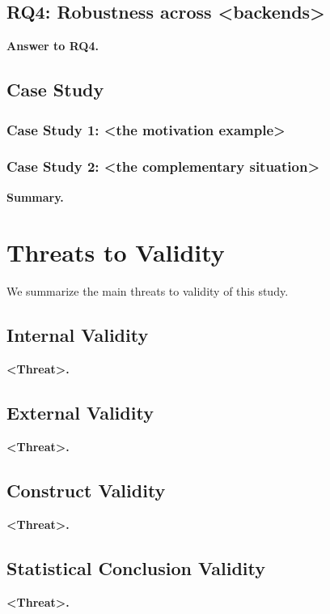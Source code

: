 \documentclass[manuscript,anonymous]{acmart}
\begin{document}
\subsection{RQ4: Robustness across <backends>}
\begin{answerbox}\textbf{Answer to RQ4.}\end{answerbox}

\subsection{Case Study}\label{sec:case_study}

\subsubsection{Case Study 1: <the motivation example>}

\subsubsection{Case Study 2: <the complementary situation>}
\begin{answerbox}\textbf{Summary.}\end{answerbox}

\section{Threats to Validity}\label{sec:threats}

We summarize the main threats to validity of this study.

\subsection{Internal Validity}
\textbf{<Threat>.}

\subsection{External Validity}
\textbf{<Threat>.}

\subsection{Construct Validity}
\textbf{<Threat>.}

\subsection{Statistical Conclusion Validity}
\textbf{<Threat>.}
\end{document}
